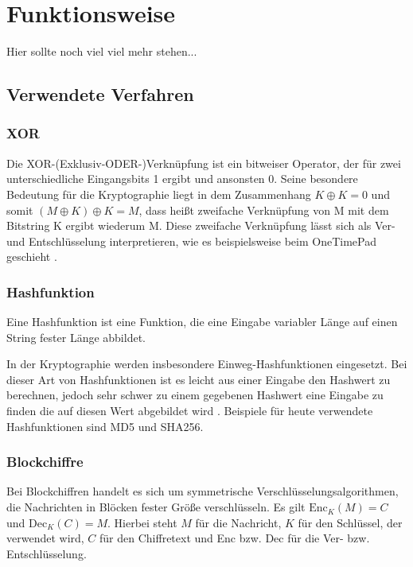 \section{Funktionsweise}
\label{sec:funktionsweise}

Hier sollte noch viel viel mehr stehen...

\subsection{Verwendete Verfahren}

\subsubsection{XOR}
Die XOR-(Exklusiv-ODER-)Verknüpfung ist ein bitweiser Operator, der für zwei unterschiedliche Eingangsbits 1 ergibt und ansonsten 0. Seine besondere Bedeutung für die Kryptographie liegt in dem Zusammenhang \(K \oplus K = 0\) und somit \((M \oplus K) \oplus K = M\), dass heißt zweifache Verknüpfung von M mit dem Bitstring K ergibt wiederum M. Diese zweifache Verknüpfung lässt sich als Ver- und Entschlüsselung interpretieren, wie es beispielsweise beim OneTimePad geschieht \cite{Schneier2006}.%

\subsubsection{Hashfunktion}
Eine Hashfunktion ist eine Funktion, die eine Eingabe variabler Länge auf einen String fester Länge abbildet.

In der Kryptographie werden insbesondere Einweg-Hashfunktionen eingesetzt. Bei dieser Art von Hashfunktionen ist es leicht aus einer Eingabe den Hashwert zu berechnen, jedoch sehr schwer zu einem gegebenen Hashwert eine Eingabe zu finden die auf diesen Wert abgebildet wird \cite{Schneier2006}. Beispiele für heute verwendete Hashfunktionen sind MD5 und SHA256.

\subsubsection{Blockchiffre}
Bei Blockchiffren handelt es sich um symmetrische Verschlüsselungsalgorithmen, die Nachrichten in Blöcken fester Größe verschlüsseln. Es gilt \(\text{Enc}_K(M)=C\) und \(\text{Dec}_K(C)=M\). Hierbei steht \(M\) für die Nachricht, \(K\) für den Schlüssel, der verwendet wird, \(C\) für den Chiffretext und Enc bzw. Dec für die Ver- bzw. Entschlüsselung\cite{Schneier2006}.

